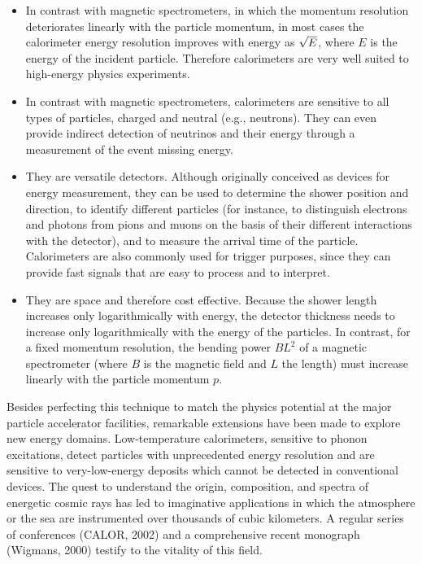 \begin{itemize}
		\item In contrast with magnetic spectrometers, in which the momentum  resolution  deteriorates  linearly  with  the particle momentum, in most cases the calorimeter energy resolution improves with energy as $\/\sqrt{E}$,  where $E$ is  the  energy  of  the  incident  particle.  Therefore calorimeters are very well suited to high-energy physics experiments.
		\item In contrast with magnetic spectrometers, calorimeters are sensitive to all types of particles, charged and neutral  (e.g.,  neutrons).  They  can  even  provide  indirect detection  of  neutrinos  and  their  energy  through  a measurement of the event missing energy.
		\item They are versatile detectors. Although originally conceived  as  devices  for  energy  measurement,  they  can be  used  to  determine  the  shower  position  and  direction, to identify different particles (for instance, to distinguish electrons and photons from pions and muons on  the  basis  of  their  different  interactions  with  the detector), and to measure the arrival time of the particle. Calorimeters are also commonly used for trigger purposes,  since  they  can  provide  fast  signals  that  are easy to process and to interpret.
		\item They  are  space  and  therefore  cost  effective.  Because the shower length increases only logarithmically with energy,  the  detector  thickness  needs  to  increase  only logarithmically  with  the  energy  of  the  particles.  In contrast, for a fixed momentum resolution, the bending power $BL^2$ of a magnetic spectrometer (where $B$ is the magnetic field and $L$ the length) must increase linearly with the particle momentum $p$.
\end{itemize}
Besides perfecting this technique to match the physics potential  at  the  major  particle  accelerator  facilities,  remarkable  extensions  have  been  made  to  explore  new energy  domains.
Low-temperature  calorimeters,  sensitive to phonon excitations, detect particles with unprecedented energy resolution and are sensitive to very-low-energy deposits which cannot be detected in conventional  devices.
The  quest  to  understand  the  origin,  composition,  and  spectra  of  energetic  cosmic  rays has  led  to  imaginative  applications  in  which  the  atmosphere  or  the  sea  are  instrumented  over  thousands  of cubic kilometers.
A regular series of conferences (CALOR, 2002) and a comprehensive recent monograph (Wigmans, 2000) testify to the vitality of this field.\\




